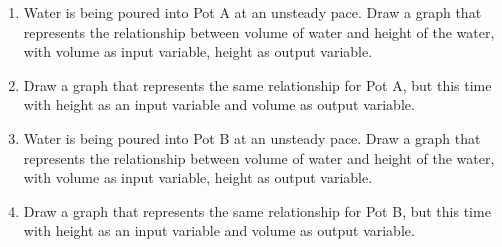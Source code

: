 \documentclass[11pt]{article}
\theoremstyle{definition}
\begin{document}
\begin{enumerate}[resume]
\begin{enumerate}
\item Water is being poured into Pot A at an unsteady pace. Draw a graph that represents the relationship between volume of water and height of the water, with volume as input variable, height as output variable.
\item Draw a graph that represents the same relationship for Pot A, but this time with height as an input variable and volume as output variable.
\item Water is being poured into Pot B at an unsteady pace. Draw a graph that represents the relationship between volume of water and height of the water, with volume as input variable, height as output variable.
\item Draw a graph that represents the same relationship for Pot B, but this time with height as an input variable and volume as output variable.
\end{enumerate}
\end{enumerate}

\begin{center}
\end{center}

	
\newpage
\end{document}
